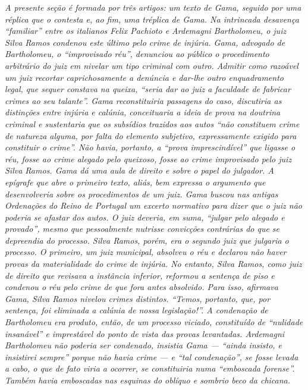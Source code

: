\begin{argumento}
\emph{A presente seção é formada por três artigos: um texto de Gama,
seguido por uma réplica que o contesta e, ao fim, uma tréplica de Gama.
Na intrincada desavença ``familiar'' entre os italianos Felix Pachioto e
Ardemagni Bartholomeu, o juiz Silva Ramos condenou este último pelo
crime de injúria. Gama, advogado de Bartholomeu, o ``improvisado réu'',
denunciou ao público o procedimento arbitrário do juiz em nivelar um
tipo criminal com outro. Admitir como razoável um juiz recortar
caprichosamente a denúncia e dar-lhe outro enquadramento legal, que
sequer constava na queixa, ``seria dar ao juiz a faculdade de fabricar
crimes ao seu talante''. Gama reconstituiria passagens do caso,
discutiria as distinções entre injúria e calúnia, conceituaria a ideia
de prova na doutrina criminal e sustentaria que os subsídios trazidos
aos autos ``não constituem crime de natureza alguma, por falta do
elemento subjetivo, expressamente exigido para constituir o crime''. Não
havia, portanto, a ``prova imprescindível'' que ligasse o réu, fosse ao
crime alegado pelo queixoso, fosse ao crime improvisado pelo juiz Silva
Ramos. Gama dá uma aula de direito e sobre o papel do julgador. A
epígrafe que abre o primeiro texto, aliás, bem expressa o argumento que
desenvolveria sobre os procedimentos de um juiz. Gama buscou nas antigas
Ordenações do Reino de Portugal um excerto normativo para dizer que o
juiz não poderia se afastar dos autos. O juiz deveria, em suma, ``julgar
pelo alegado e provado'', mesmo que pessoalmente nutrisse convicções
contrárias do que se depreendia do processo. Silva Ramos, porém, era o
segundo juiz que julgaria o processo. O primeiro, um juiz municipal,
absolveu o réu e declarou não haver provas da materialidade do crime de
injúria. No entanto, Silva Ramos, como juiz de direito que revisava a
instância inferior, reformou a sentença de piso e condenou o réu pelo
crime de que fora antes absolvido. Para isso, afirmava Gama, Silva Ramos
nivelou crimes distintos. ``Temos, portanto, que, por sentença, foi
eliminada a calúnia de nossa legislação!''. A condenação de Bartholomeu
era produto, então, de um processo viciado, constituído de ``nulidade
insanável'' e imprestável do ponto de vista das provas levantadas.
Ardemagni Bartholomeu não poderia ser condenado, insistia Gama --- ``ainda
insisto, e insistirei sempre'' porque não havia crime --- e ``tal
condenação'', se fosse levada a cabo, o que de fato viria a ocorrer, se
constituiria numa ``emboscada forense''. Também havia emboscadas nas
esquinas do oblíquo e sombrio beco da chicana.}
\end{argumento}

